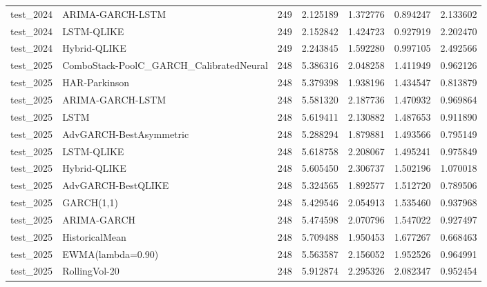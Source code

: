 \begin{tabular}{l l r r r r r}
test\_2024 & ARIMA-GARCH-LSTM & 249 & 2.125189 & 1.372776 & 0.894247 & 2.133602 \\
test\_2024 & LSTM-QLIKE & 249 & 2.152842 & 1.424723 & 0.927919 & 2.202470 \\
test\_2024 & Hybrid-QLIKE & 249 & 2.243845 & 1.592280 & 0.997105 & 2.492566 \\
test\_2025 & ComboStack-PoolC\_GARCH\_CalibratedNeural & 248 & 5.386316 & 2.048258 & 1.411949 & 0.962126 \\
test\_2025 & HAR-Parkinson & 248 & 5.379398 & 1.938196 & 1.434547 & 0.813879 \\
test\_2025 & ARIMA-GARCH-LSTM & 248 & 5.581320 & 2.187736 & 1.470932 & 0.969864 \\
test\_2025 & LSTM & 248 & 5.619411 & 2.130882 & 1.487653 & 0.911890 \\
test\_2025 & AdvGARCH-BestAsymmetric & 248 & 5.288294 & 1.879881 & 1.493566 & 0.795149 \\
test\_2025 & LSTM-QLIKE & 248 & 5.618758 & 2.208067 & 1.495241 & 0.975849 \\
test\_2025 & Hybrid-QLIKE & 248 & 5.605450 & 2.306737 & 1.502196 & 1.070018 \\
test\_2025 & AdvGARCH-BestQLIKE & 248 & 5.324565 & 1.892577 & 1.512720 & 0.789506 \\
test\_2025 & GARCH(1,1) & 248 & 5.429546 & 2.054913 & 1.535460 & 0.937968 \\
test\_2025 & ARIMA-GARCH & 248 & 5.474598 & 2.070796 & 1.547022 & 0.927497 \\
test\_2025 & HistoricalMean & 248 & 5.709488 & 1.950453 & 1.677267 & 0.668463 \\
test\_2025 & EWMA(lambda=0.90) & 248 & 5.563587 & 2.156052 & 1.952526 & 0.964991 \\
test\_2025 & RollingVol-20 & 248 & 5.912874 & 2.295326 & 2.082347 & 0.952454 \\
\hline
\end{tabular}
